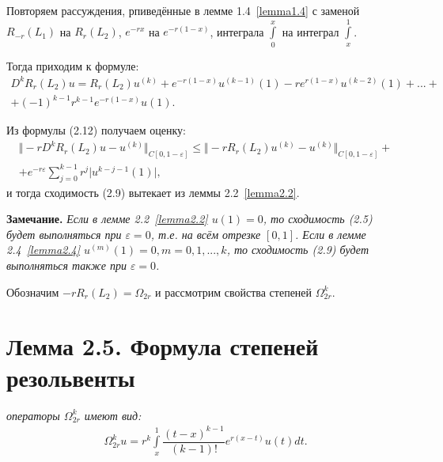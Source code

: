Повторяем рассуждения, рпиведённые в лемме 1.4~\eqref{lemma1.4} с заменой $ R_{-r}(L_1) $ на $ R_r(L_2) $, $ e^{-rx} $ на $ e^{-r(1-x)} $, интеграла $ \int\limits_0^x $ на интеграл $ \int\limits_x^1 $.

Тогда приходим к формуле:
\begin{equation}
\begin{array}{c}

D^kR_r(L_2)u = R_r(L_2)u^{(k)} + e^{-r(1-x)}u^{(k-1)}(1) - re^{r(1-x)}u^{(k-2)}(1) + ... + \\ + (-1)^{k-1}r^{k-1}e^{-r(1-x)}u(1).

\end{array}
\end{equation}

Из формулы (2.12) получаем оценку:
\begin{equation}
\begin{array}{c}
\nonumber

\Vert -rD^kR_r(L_2)u - u^{(k)} \Vert_{C[0,1-\varepsilon]} \leq \Vert -rR_r(L_2)u^{(k)} - u^{(k)} \Vert_{C[0,1-\varepsilon]} + \\ + e^{-r\varepsilon}\sum\limits_{j=0}^{k-1} r^j\vert u^{k-j-1}(1)\vert ,

\end{array}
\end{equation}
и тогда сходимость (2.9) вытекает из леммы 2.2~\eqref{lemma2.2}.

\textbf{Замечание.} \textit{Если в лемме 2.2~\eqref{lemma2.2} $ u(1) = 0 $, то сходимость (2.5) будет выполняться при $ \varepsilon = 0 $, т.е. на всём отрезке $ [0,1] $. Если в лемме 2.4~\eqref{lemma2.4} $ u^{(m)}(1) = 0, m = 0,1,...,k $, то сходимость (2.9) будет выполняться также при $ \varepsilon = 0 $.}

Обозначим $ -rR_r(L_2) = \Omega_{2r} $ и рассмотрим свойства степеней $ \Omega_{2r}^k $.

\section{Лемма 2.5. Формула степеней резольвенты}
\label{lemma2.5}
\textit{операторы $ \Omega_{2r}^k $ имеют вид:}
\begin{equation}
\begin{array}{c}

\Omega_{2r}^ku = r^k\int\limits_x^1 \dfrac{(t-x)^{k-1}}{(k-1)!}e^{r(x-t)}u(t)dt.

\end{array}
\end{equation}


